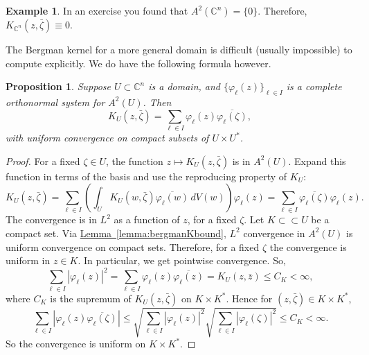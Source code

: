 \documentclass[12pt,openany]{book}
\newcommand{\abs}[1]{\left\lvert {#1} \right\rvert}
\newcommand{\C}{{\mathbb{C}}}
\theoremstyle{plain}
\newtheorem{prop}[thm]{Proposition}
\theoremstyle{remark}
\theoremstyle{definition}
\theoremstyle{exercise}
\theoremstyle{example}
\newtheorem{example}[thm]{Example}
\newcommand{\lemmaref}[1]{\hyperref[#1]{Lemma~\ref*{#1}}}
\begin{document}
\begin{example}
In an exercise you found that
$A^2(\C^n) = \{ 0 \}$.  Therefore,
$K_{\C^n}(z,\bar{\zeta}) \equiv 0$.
\end{example}

The Bergman kernel for a more general domain is difficult (usually impossible)
to compute explicitly.  We do have the following formula however.

\begin{prop}
Suppose $U \subset \C^n$ is a domain, and
$\{ \varphi_\ell (z) \}_{\ell\in I}$ is a complete orthonormal system
for $A^2(U)$.  Then
\begin{equation*}
K_U(z,\bar{\zeta})
=
\sum_{\ell \in I} \varphi_\ell(z) \overline{\varphi_\ell(\zeta)} ,
\end{equation*}
with uniform convergence on compact subsets of $U \times U^*$.
\end{prop}

\begin{proof}
For a fixed $\zeta \in U$, the function $z \mapsto K_U(z,\bar{\zeta})$ is
in $A^2(U)$.
Expand this function
in terms of the basis and use the reproducing property of $K_U$:
\begin{equation*}
K_U(z,\bar{\zeta}) =
\sum_{\ell \in I}
\left(\int_U K_U(w,\bar{\zeta}) \overline{\varphi_\ell(w)} \, dV(w) \right)
\varphi_\ell(z)
=
\sum_{\ell \in I}
\overline{\varphi_\ell(\zeta)}
\varphi_\ell(z) .
\end{equation*}
The convergence is in $L^2$ as a function of $z$, for a fixed $\zeta$.
Let $K \subset \subset U$ be a compact set.
Via \lemmaref{lemma:bergmanKbound}, $L^2$ convergence in $A^2(U)$ is uniform convergence on
compact sets.  Therefore, for a fixed $\zeta$ the convergence is uniform in
$z \in K$.  In particular, we get pointwise convergence.  So,
\begin{equation*}
\sum_{\ell \in I}
\abs{
\varphi_\ell(z)
}^2
=
\sum_{\ell \in I}
\varphi_\ell(z)
\overline{\varphi_\ell(z)}
=
K_U(z,\bar{z})
\leq C_K < \infty ,
\end{equation*}
where $C_K$ is the supremum of $K_U(z,\bar{\zeta})$ on $K \times K^*$.
Hence for $(z,\bar{\zeta}) \in K \times K^*$,
\begin{equation*}
\sum_{\ell \in I}
\abs{
\varphi_\ell(z)
\overline{\varphi_\ell(\zeta)}
}
\leq
\sqrt{
\sum_{\ell \in I}
\abs{
\varphi_\ell(z)
}^2
}
\sqrt{
\sum_{\ell \in I}
\abs{
\varphi_\ell(\zeta)
}^2
}
\leq
C_K < \infty .
\end{equation*}
So the convergence is uniform on $K \times K^*$.
\end{proof}
\end{document}
